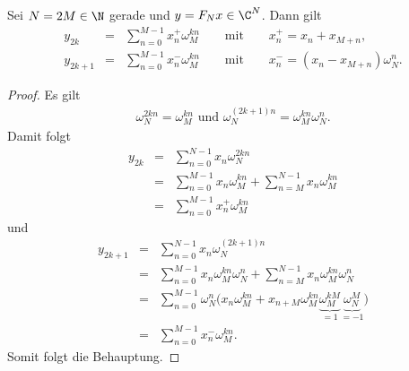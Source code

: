 \begin{Lemma}
    \label{lem:2.13}
    Sei $N = 2 M \in \N$ gerade und $y = F_N x \in \C^N$. Dann gilt
    \begin{eqnarray*}
            y_{2k}
        &=& \sum_{n=0}^{M-1} x_n^+ \omega_{M}^{kn}
            \qquad \text{mit} \qquad x_n^+ = x_n + x_{M+n}, \\
            y_{2k+1}
        &=& \sum_{n=0}^{M-1} x_n^- \omega_{M}^{kn}
            \qquad \text{mit} \qquad x_n^- = (x_n - x_{M+n})
            \omega_N^n.
    \end{eqnarray*}
\end{Lemma}


\begin{proof}
    Es gilt
    \begin{eqnarray*}
        \omega_N^{2kn} = \omega_M^{kn} \text{ und } \omega_N^{(2k+1)n} = 
        \omega_M^{kn} \omega_N^n.
    \end{eqnarray*}
    Damit folgt
    \begin{eqnarray*}
            y_{2k}
        &=& \sum_{n=0}^{N-1} x_n \omega_N^{2kn} \\
        &=& \sum_{n=0}^{M-1} x_n \omega_M^{kn} + \sum_{n=M}^{N-1} x_n
            \omega_M^{kn} \\
        &=& \sum_{n=0}^{M-1} x_n^+ \omega_M^{kn}
    \end{eqnarray*}
    und
    \begin{eqnarray*}
            y_{2k+1}
        &=& \sum_{n=0}^{N-1} x_n \omega_N^{(2k+1)n} \\
        &=& \sum_{n=0}^{M-1} x_n \omega_M^{kn} \omega_N^n
            + \sum_{n=M}^{N-1} x_n \omega_M^{kn} \omega_N^n \\
        &=& \sum_{n=0}^{M-1} \omega_N^n \biggl(x_n \omega_M^{kn} + x_{n+M}
            \omega_M^{kn} \underbrace{\omega_M^{kM}}_{= 1}
            \underbrace{\omega_N^M}_{= -1}\biggr) \\
        &=& \sum_{n=0}^{M-1} x_n^- \omega_M^{kn}.
    \end{eqnarray*}
    Somit folgt die Behauptung.
\end{proof}


